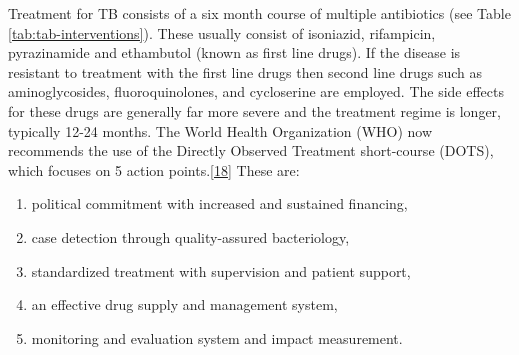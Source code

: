 \documentclass[11pt,twoside]{bristolthesis}
\providecommand{\tightlist}{%
  \setlength{\itemsep}{0pt}\setlength{\parskip}{0pt}}
\begin{document}
  Treatment for TB consists of a six month course of multiple antibiotics (see Table \ref{tab:tab-interventions}). These usually consist of isoniazid, rifampicin, pyrazinamide and ethambutol (known as first line drugs). If the disease is resistant to treatment with the first line drugs then second line drugs such as aminoglycosides, fluoroquinolones, and cycloserine are employed. The side effects for these drugs are generally far more severe and the treatment regime is longer, typically 12-24 months. The World Health Organization (WHO) now recommends the use of the Directly Observed Treatment short-course (DOTS), which focuses on 5 action points.{[}\protect\hyperlink{ref-WHOTB2016}{18}{]} These are:
  \begin{enumerate}
  \def\labelenumi{\arabic{enumi}.}
  \tightlist
  \item
    political commitment with increased and sustained financing,
  \item
    case detection through quality-assured bacteriology,
  \item
    standardized treatment with supervision and patient support,
  \item
    an effective drug supply and management system,
  \item
    monitoring and evaluation system and impact measurement.
  \end{enumerate}
\end{document}
